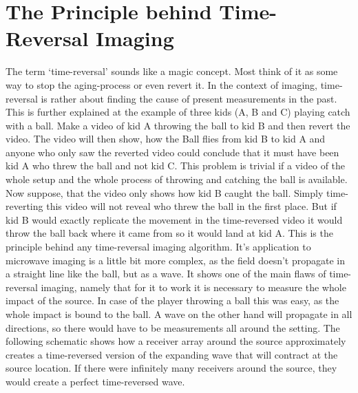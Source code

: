 \section{The Principle behind Time-Reversal Imaging}
The term `time-reversal' sounds like a magic concept.
Most think of it as some way to stop the aging-process or even revert it.
In the context of imaging, time-reversal is rather about finding the cause of present measurements in the past.
This is further explained at the example of three kids (A, B and C) playing catch with a ball.
Make a video of kid A throwing the ball to kid B and then revert the video.
The video will then show, how the Ball flies from kid B to kid A and anyone who only saw the reverted video could conclude that it must have been kid A who threw the ball and not kid C.
This problem is trivial if a video of the whole setup and the whole process of throwing and catching the ball is available.
Now suppose, that the video only shows how kid B caught the ball.
Simply time-reverting this video will not reveal who threw the ball in the first place.
But if kid B would exactly replicate the movement in the time-reversed video it would throw the ball back where it came from so it would land at kid A.
This is the principle behind any time-reversal imaging algorithm.
It's application to microwave imaging is a little bit more complex, as the field doesn't propagate in a straight line like the ball, but as a wave.
It shows one of the main flaws of time-reversal imaging, namely that for it to work it is necessary to measure the whole impact of the source.
In case of the player throwing a ball this was easy, as the whole impact is bound to the ball.
A wave on the other hand will propagate in all directions, so there would have to be measurements all around the setting.
The following schematic shows how a receiver array around the source approximately creates a time-reversed version of the expanding wave that will contract at the source location.
If there were infinitely many receivers around the source, they would create a perfect time-reversed wave.

